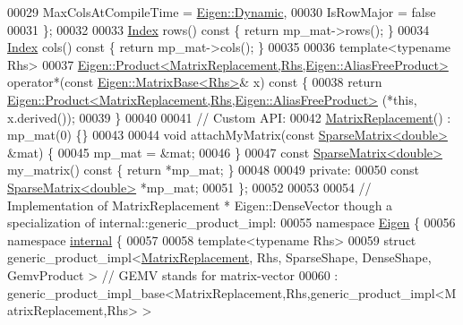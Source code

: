 \begin{DoxyCode}
00029     MaxColsAtCompileTime = \hyperlink{namespace_eigen_ad81fa7195215a0ce30017dfac309f0b2}{Eigen::Dynamic},
00030     IsRowMajor = \textcolor{keyword}{false}
00031   \};
00032 
00033   \hyperlink{namespace_eigen_a62e77e0933482dafde8fe197d9a2cfde}{Index} rows()\textcolor{keyword}{ const }\{ \textcolor{keywordflow}{return} mp\_mat->rows(); \}
00034   \hyperlink{namespace_eigen_a62e77e0933482dafde8fe197d9a2cfde}{Index} cols()\textcolor{keyword}{ const }\{ \textcolor{keywordflow}{return} mp\_mat->cols(); \}
00035 
00036   \textcolor{keyword}{template}<\textcolor{keyword}{typename} Rhs>
00037   \hyperlink{group___core___module_class_eigen_1_1_product}{Eigen::Product<MatrixReplacement,Rhs,Eigen::AliasFreeProduct>}
       operator*(\textcolor{keyword}{const} \hyperlink{group___core___module_class_eigen_1_1_matrix_base}{Eigen::MatrixBase<Rhs>}& x)\textcolor{keyword}{ const }\{
00038     \textcolor{keywordflow}{return} \hyperlink{group___core___module_class_eigen_1_1_product}{Eigen::Product<MatrixReplacement,Rhs,Eigen::AliasFreeProduct>}
      (*\textcolor{keyword}{this}, x.derived());
00039   \}
00040 
00041   \textcolor{comment}{// Custom API:}
00042   \hyperlink{class_matrix_replacement}{MatrixReplacement}() : mp\_mat(0) \{\}
00043 
00044   \textcolor{keywordtype}{void} attachMyMatrix(\textcolor{keyword}{const} \hyperlink{group___sparse_core___module_class_eigen_1_1_sparse_matrix}{SparseMatrix<double>} &mat) \{
00045     mp\_mat = &mat;
00046   \}
00047   \textcolor{keyword}{const} \hyperlink{group___sparse_core___module_class_eigen_1_1_sparse_matrix}{SparseMatrix<double>} my\_matrix()\textcolor{keyword}{ const }\{ \textcolor{keywordflow}{return} *mp\_mat; \}
00048 
00049 \textcolor{keyword}{private}:
00050   \textcolor{keyword}{const} \hyperlink{group___sparse_core___module_class_eigen_1_1_sparse_matrix}{SparseMatrix<double>} *mp\_mat;
00051 \};
00052 
00053 
00054 \textcolor{comment}{// Implementation of MatrixReplacement * Eigen::DenseVector though a specialization of
       internal::generic\_product\_impl:}
00055 \textcolor{keyword}{namespace }\hyperlink{namespace_eigen}{Eigen} \{
00056 \textcolor{keyword}{namespace }\hyperlink{namespaceinternal}{internal} \{
00057 
00058   \textcolor{keyword}{template}<\textcolor{keyword}{typename} Rhs>
00059   \textcolor{keyword}{struct }generic\_product\_impl<\hyperlink{class_matrix_replacement}{MatrixReplacement}, Rhs, SparseShape, DenseShape, GemvProduct
      > \textcolor{comment}{// GEMV stands for matrix-vector}
00060   : generic\_product\_impl\_base<MatrixReplacement,Rhs,generic\_product\_impl<MatrixReplacement,Rhs> >

\end{DoxyCode}
